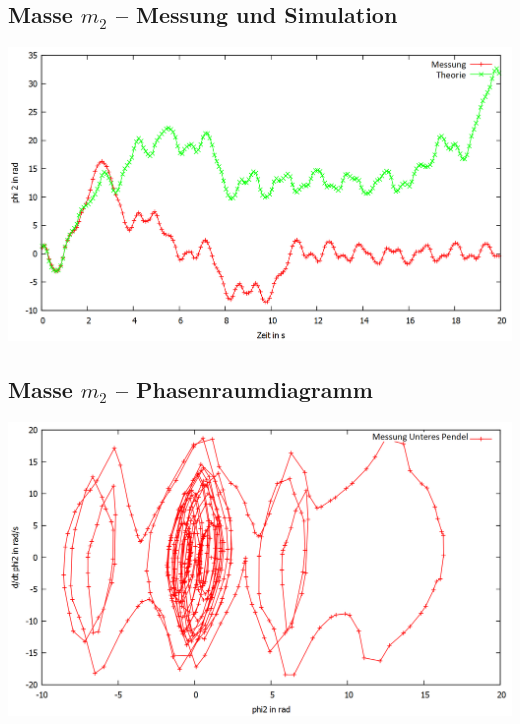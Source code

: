 \subsection*{Masse $m_2$ -- Messung und Simulation}
\begin{frame}
	\includegraphics[width=\textwidth]{images/4/phi2uebert}
\end{frame}

\subsection*{Masse $m_2$ -- Phasenraumdiagramm}
\begin{frame}
	\includegraphics[width=\textwidth]{images/4/phi2_ueberphi2}
\end{frame}
